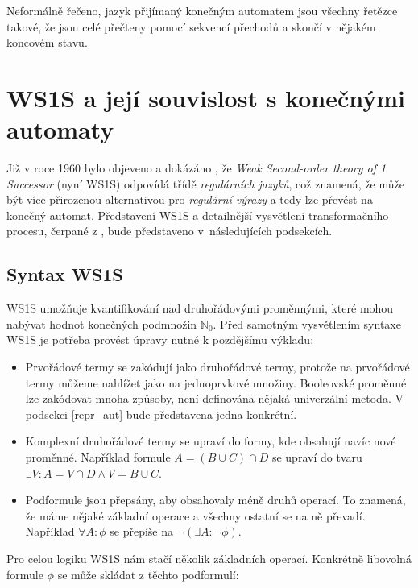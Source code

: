 Neformálně řečeno, jazyk přijímaný konečným automatem jsou všechny řetězce takové, že jsou celé přečteny pomocí sekvencí přechodů a skončí v nějakém koncovém stavu.


\section{WS1S a její souvislost s konečnými automaty}

Již v roce 1960 bylo objeveno a dokázáno \cite{buchi_ws1s_fa}, že \textit{Weak Second-order theory of 1 Successor} (nyní WS1S) odpovídá třídě \textit{regulárních jazyků}, což znamená, že může být více přirozenou alternativou pro \textit{regulární výrazy} a tedy lze převést na konečný automat. Představení WS1S a detailnější vysvětlení transformačního procesu, čerpané z \cite{mona_manual}, bude představeno v~následujících podsekcích. 

\subsection{Syntax WS1S}

WS1S umožňuje kvantifikování nad druhořádovými proměnnými, které mohou nabývat hodnot konečných podmnožin $\mathbb{N}_0$. Před samotným vysvětlením syntaxe WS1S je potřeba provést úpravy nutné k pozdějšímu výkladu:

\begin{itemize}
    \item Prvořádové termy se zakódují jako druhořádové termy, protože na prvořádové termy můžeme nahlížet jako na jednoprvkové množiny. Booleovské proměnné lze zakódovat mnoha způsoby, není definována nějaká univerzální metoda. V podsekci \ref{repr_aut} bude představena jedna konkrétní.
    \item Komplexní druhořádové termy se upraví do formy, kde obsahují navíc nové proměnné. Například formule $A = (B \cup C) \cap D$ se upraví do tvaru $ \exists V: A = V \cap D \wedge V = B \cup C$.
    \item Podformule jsou přepsány, aby obsahovaly méně druhů operací. To znamená, že máme nějaké základní operace a všechny ostatní se na ně převadí. Například $ \forall A: \phi $ se přepíše na $ \neg ( \exists A: \neg \phi) $.
\end{itemize}

Pro celou logiku WS1S nám stačí několik základních operací. Konkrétně libovolná formule $\phi$ se může skládat z těchto podformulí:

